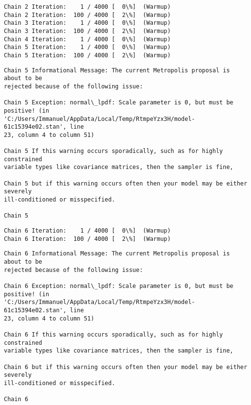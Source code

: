 \documentclass[11pt]{article}
\begin{document}
    \begin{Verbatim}[commandchars=\\\{\}]
Chain 2 Iteration:    1 / 4000 [  0\%]  (Warmup)
Chain 2 Iteration:  100 / 4000 [  2\%]  (Warmup)
Chain 3 Iteration:    1 / 4000 [  0\%]  (Warmup)
Chain 3 Iteration:  100 / 4000 [  2\%]  (Warmup)
Chain 4 Iteration:    1 / 4000 [  0\%]  (Warmup)
Chain 5 Iteration:    1 / 4000 [  0\%]  (Warmup)
Chain 5 Iteration:  100 / 4000 [  2\%]  (Warmup)
    \end{Verbatim}

    \begin{Verbatim}[commandchars=\\\{\}]
Chain 5 Informational Message: The current Metropolis proposal is about to be
rejected because of the following issue:

Chain 5 Exception: normal\_lpdf: Scale parameter is 0, but must be positive! (in
'C:/Users/Immanuel/AppData/Local/Temp/RtmpeYzx3H/model-61c15394e02.stan', line
23, column 4 to column 51)

Chain 5 If this warning occurs sporadically, such as for highly constrained
variable types like covariance matrices, then the sampler is fine,

Chain 5 but if this warning occurs often then your model may be either severely
ill-conditioned or misspecified.

Chain 5

    \end{Verbatim}

    \begin{Verbatim}[commandchars=\\\{\}]
Chain 6 Iteration:    1 / 4000 [  0\%]  (Warmup)
Chain 6 Iteration:  100 / 4000 [  2\%]  (Warmup)
    \end{Verbatim}

    \begin{Verbatim}[commandchars=\\\{\}]
Chain 6 Informational Message: The current Metropolis proposal is about to be
rejected because of the following issue:

Chain 6 Exception: normal\_lpdf: Scale parameter is 0, but must be positive! (in
'C:/Users/Immanuel/AppData/Local/Temp/RtmpeYzx3H/model-61c15394e02.stan', line
23, column 4 to column 51)

Chain 6 If this warning occurs sporadically, such as for highly constrained
variable types like covariance matrices, then the sampler is fine,

Chain 6 but if this warning occurs often then your model may be either severely
ill-conditioned or misspecified.

Chain 6

    \end{Verbatim}
\end{document}
